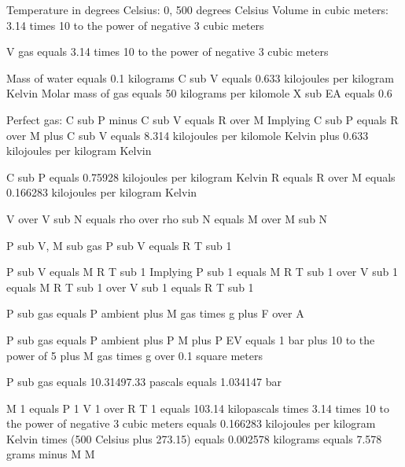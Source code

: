 Temperature in degrees Celsius: 0, 500 degrees Celsius  
Volume in cubic meters: 3.14 times 10 to the power of negative 3 cubic meters  

V gas equals 3.14 times 10 to the power of negative 3 cubic meters  

Mass of water equals 0.1 kilograms  
C sub V equals 0.633 kilojoules per kilogram Kelvin  
Molar mass of gas equals 50 kilograms per kilomole  
X sub EA equals 0.6  

Perfect gas: C sub P minus C sub V equals R over M  
Implying C sub P equals R over M plus C sub V equals 8.314 kilojoules per kilomole Kelvin plus 0.633 kilojoules per kilogram Kelvin  

C sub P equals 0.75928 kilojoules per kilogram Kelvin  
R equals R over M equals 0.166283 kilojoules per kilogram Kelvin  

V over V sub N equals rho over rho sub N equals M over M sub N  

P sub V, M sub gas  
P sub V equals R T sub 1  

P sub V equals M R T sub 1  
Implying P sub 1 equals M R T sub 1 over V sub 1 equals M R T sub 1 over V sub 1 equals R T sub 1  

P sub gas equals P ambient plus M gas times g plus F over A  

P sub gas equals P ambient plus P M plus P EV equals 1 bar plus 10 to the power of 5 plus M gas times g over 0.1 square meters  

P sub gas equals 10.31497.33 pascals equals 1.034147 bar  

M 1 equals P 1 V 1 over R T 1 equals 103.14 kilopascals times 3.14 times 10 to the power of negative 3 cubic meters  
equals 0.166283 kilojoules per kilogram Kelvin times (500 Celsius plus 273.15)  
equals 0.002578 kilograms equals 7.578 grams minus M M